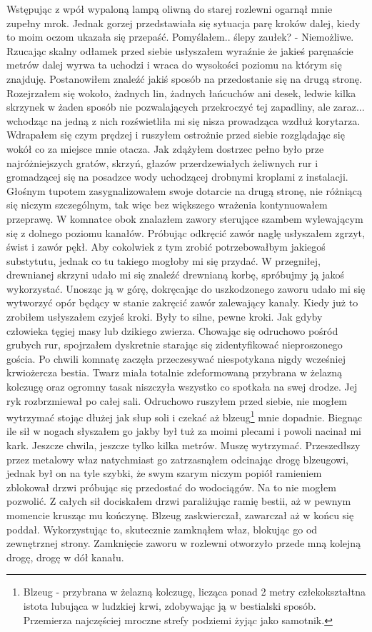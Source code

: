 \documentclass[12pt,a4paper]{report}
\begin{document}
Wstępując z wpół wypaloną lampą oliwną do starej rozlewni ogarnął mnie zupełny mrok. Jednak gorzej przedstawiała się sytuacja parę kroków dalej, kiedy to moim oczom ukazała się przepaść. Pomyślałem.. ślepy zaułek? - Niemożliwe. Rzucając skalny odłamek przed siebie usłyszałem wyraźnie że jakieś paręnaście metrów dalej wyrwa ta uchodzi i wraca do wysokości poziomu na którym się znajduję. Postanowiłem znaleźć jakiś sposób na przedostanie się na drugą stronę. Rozejrzałem się wokoło, żadnych lin, żadnych łańcuchów ani desek, ledwie kilka skrzynek w żaden sposób nie pozwalających przekroczyć tej zapadliny, ale zaraz... wchodząc na jedną z nich rozświetliła mi się nisza prowadząca wzdłuż korytarza. Wdrapałem się czym prędzej i ruszyłem ostrożnie przed siebie rozglądając się wokół co za miejsce mnie otacza. Jak zdążyłem dostrzec pełno było prze najróżniejszych gratów, skrzyń, głazów przerdzewiałych żeliwnych rur i gromadzącej się na posadzce wody uchodzącej drobnymi kroplami z instalacji. Głośnym tupotem zasygnalizowałem swoje dotarcie na drugą stronę, nie różniącą się niczym szczególnym, tak więc bez większego wrażenia kontynuowałem przeprawę. W komnatce obok znalazłem zawory sterujące szambem wylewającym się z dolnego poziomu kanałów. Próbując odkręcić zawór naglę usłyszałem zgrzyt, świst i zawór pękł. Aby cokolwiek z tym zrobić potrzebowałbym jakiegoś substytutu, jednak co tu takiego mogłoby mi się przydać. W przegniłej, drewnianej skrzyni udało mi się znaleźć drewnianą korbę, spróbujmy ją jakoś wykorzystać. Unosząc ją w górę, dokręcając do uszkodzonego zaworu udało mi się wytworzyć opór będący w stanie zakręcić zawór zalewający kanały. Kiedy już to zrobiłem usłyszałem czyjeś kroki. Były to silne, pewne kroki. Jak gdyby człowieka tęgiej masy lub dzikiego zwierza. Chowając się odruchowo pośród grubych rur, spojrzałem dyskretnie starając się zidentyfikować nieproszonego gościa. Po chwili komnatę zaczęła przeczesywać niespotykana nigdy wcześniej krwiożercza bestia. Twarz miała totalnie zdeformowaną przybrana w żelazną kolczugę oraz ogromny tasak niszczyła wszystko co spotkała na swej drodze. Jej ryk rozbrzmiewał po całej sali. Odruchowo ruszyłem przed siebie, nie mogłem wytrzymać stojąc dłużej jak słup soli i czekać aż blzeug\footnote{Blzeug - przybrana w żelazną kolczugę, licząca ponad 2 metry człekokształtna istota lubująca w ludzkiej krwi, zdobywając ją w bestialski sposób. Przemierza najczęściej mroczne strefy podziemi żyjąc jako samotnik. }  mnie dopadnie. Biegnąc ile sił w nogach słyszałem go jakby był tuż za moimi plecami i powoli nacinał mi kark. Jeszcze chwila, jeszcze tylko kilka metrów. Muszę wytrzymać. Przeszedłszy przez metalowy właz natychmiast go zatrzasnąłem odcinając drogę blzeugowi, jednak był on na tyle szybki, że swym szarym niczym popiół ramieniem zblokował drzwi próbując się przedostać do wodociągów. Na to nie mogłem pozwolić. Z całych sił dociskałem drzwi paraliżując ramię bestii, aż w pewnym momencie krusząc mu kończynę. Blzeug zaskwierczał, zawarczał aż w końcu się poddał. Wykorzystując to, skutecznie zamknąłem właz, blokując go od zewnętrznej strony. Zamknięcie zaworu w rozlewni otworzyło przede mną kolejną drogę, drogę w dół kanału.
\end{document}
